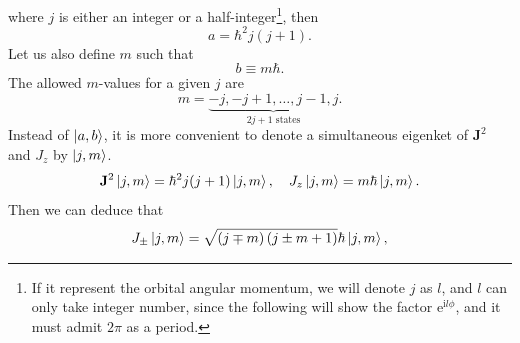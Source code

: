 \documentclass{article}
\theoremstyle{1}
\newcommand{\ii}{\mathrm{i}}
\newcommand{\ee}{\mathrm{e}}
\begin{document}
where $j$ is either an integer or a half-integer\footnote{If it represent the orbital angular momentum, we will denote $j$ as $l$, and $l$ can only take integer number, since the following will show the factor $\ee^{\ii l\phi}$, and it must admit $2\pi$ as a period.}, then 
\begin{equation}
    a=\hbar^2 j(j+1).
\end{equation}
Let us also define $m$ such that 
\begin{equation}
    b\equiv m\hbar.
\end{equation}
The allowed $m$-values for a given $j$ are
\begin{equation}
    m=\underset{2j+1 \text{ states}}{\underbrace{-j,-j+1,\dots,j-1,j}}.
\end{equation}
Instead of $\ket{a,b}$, it is more convenient to denote a simultaneous eigenket of $\mathbf{J}^2$
and $J_z$ by $\ket{j,m}$.
\begin{equation}\label{13.34}
    \mathbf{J}^2\ket{j,m}=\hbar^2 j(j+1)\ket{j,m},\quad J_z\ket{j,m}=m\hbar\ket{j,m}.
\end{equation}
Then we can deduce that 
\begin{equation}
    J_\pm\ket{j,m}=\sqrt{\left(j\mp m\right)\left(j\pm m+1\right)}\hbar\ket{j,m},
\end{equation}
\end{document}
